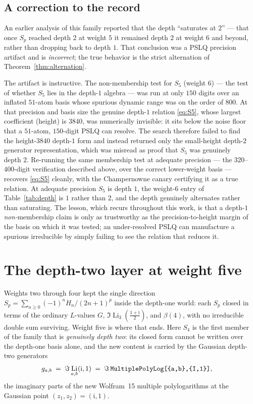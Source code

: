 \documentclass[11pt]{article}
\DeclareMathOperator{\Li}{Li}
\newcommand{\iu}{\mathrm{i}}
\theoremstyle{plain}
\theoremstyle{remark}
\begin{document}
\subsection{A correction to the record}

An earlier analysis of this family reported that the depth ``saturates at $2$'' --- that once $S_p$ reached depth $2$ at weight $5$ it remained depth $2$ at weight $6$ and beyond, rather than dropping back to depth $1$. That conclusion was a PSLQ precision artifact and is \emph{incorrect}; the true behavior is the strict alternation of Theorem~\ref{thm:alternation}.

The artifact is instructive. The non-membership test for $S_5$ (weight $6$) --- the test of whether $S_5$ lies in the depth-$1$ algebra --- was run at only $150$ digits over an inflated $51$-atom basis whose spurious dynamic range was on the order of $800$. At that precision and basis size the genuine depth-$1$ relation \eqref{eq:S5}, whose largest coefficient (height) is $3840$, was numerically invisible: it sits below the noise floor that a $51$-atom, $150$-digit PSLQ can resolve. The search therefore failed to find the height-$3840$ depth-$1$ form and instead returned only the small-height depth-$2$ generator representation, which was misread as proof that $S_5$ was genuinely depth $2$. Re-running the same membership test at adequate precision --- the $320$--$400$-digit verification described above, over the correct lower-weight basis --- recovers \eqref{eq:S5} cleanly, with the Champernowne canary certifying it as a true relation. At adequate precision $S_5$ is depth $1$, the weight-$6$ entry of Table~\ref{tab:depth} is $1$ rather than $2$, and the depth genuinely alternates rather than saturating. The lesson, which recurs throughout this work, is that a depth-$1$ \emph{non-}membership claim is only as trustworthy as the precision-to-height margin of the basis on which it was tested; an under-resolved PSLQ can manufacture a spurious irreducible by simply failing to see the relation that reduces it.


\section{The depth-two layer at weight five}
\label{sec:depth-two-weight-five}

Weights two through four kept the single direction $S_p=\sum_{n\ge0}(-1)^n H_n/(2n+1)^{p}$ inside the depth-one world: each $S_p$ closed in terms of the ordinary $L$-values $G$, $\Im\Li_3(\tfrac{1+\iu}{2})$, and $\beta(4)$, with no irreducible double sum surviving. Weight five is where that ends. Here $S_4$ is the first member of the family that is \emph{genuinely depth two}: its closed form cannot be written over the depth-one basis alone, and the new content is carried by the Gaussian depth-two generators
\[
  g_{a,b}\;=\;\Im\Li_{a,b}(\iu,1)\;=\;\Im\,\texttt{MultiplePolyLog[\{a,b\},\allowbreak\{I,1\}]},
\]
the imaginary parts of the new Wolfram~15 multiple polylogarithms at the Gaussian point $(z_1,z_2)=(\iu,1)$.
\end{document}
